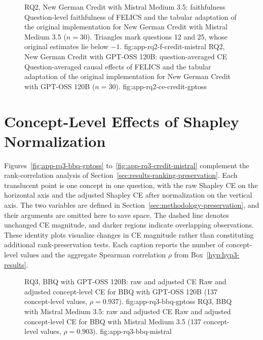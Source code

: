\begin{figure}[H]
  \centering
    {RQ2, New German Credit with Mistral Medium 3.5: faithfulness}%
    {Question-level faithfulness of FELICS and the tabular adaptation of the original implementation for New German Credit with Mistral Medium 3.5 ($n=30$). Triangles mark questions 12 and 25, whose original estimates lie below $-1$.}%
    {fig:app-rq2-f-credit-mistral}%
  \hfill
    {RQ2, New German Credit with GPT-OSS 120B: question-averaged CE}%
    {Question-averaged causal effects of FELICS and the tabular adaptation of the original implementation for New German Credit with GPT-OSS 120B ($n=30$).}%
    {fig:app-rq2-ce-credit-gptoss}%
\end{figure}

\section{Concept-Level Effects of Shapley Normalization}
\label{app:rq3-normalization-identity}

Figures~\ref{fig:app-rq3-bbq-gptoss} to~\ref{fig:app-rq3-credit-mistral} complement the rank-correlation analysis of Section~\ref{sec:results-ranking-preservation}. Each translucent point is one concept in one question, with the raw Shapley CE on the horizontal axis and the adjusted Shapley CE after normalization on the vertical axis. The two variables are defined in Section~\ref{sec:methodology-preservation}, and their arguments are omitted here to save space. The dashed line denotes unchanged CE magnitude, and darker regions indicate overlapping observations. These identity plots visualize changes in CE magnitude rather than constituting additional rank-preservation tests. Each caption reports the number of concept-level values and the aggregate Spearman correlation $\rho$ from Box~\ref{hyp:hyp3-results}.

\begin{figure}[H]
  \centering
    {RQ3, BBQ with GPT-OSS 120B: raw and adjusted CE}%
    {Raw and adjusted concept-level CE for BBQ with GPT-OSS 120B (137 concept-level values, $\rho=0.937$).}%
    {fig:app-rq3-bbq-gptoss}%
  \hfill
    {RQ3, BBQ with Mistral Medium 3.5: raw and adjusted CE}%
    {Raw and adjusted concept-level CE for BBQ with Mistral Medium 3.5 (137 concept-level values, $\rho=0.903$).}%
    {fig:app-rq3-bbq-mistral}%
\end{figure}

